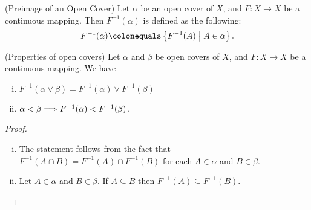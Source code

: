 \documentclass[10pt,twoside,draft]{book}
\begin{document}
\begin{definition}
  (Preimage of an Open Cover)
  Let $\alpha$ be an open cover of $X$, and $F: X \to X$ be a continuous mapping.
  Then $F^{-1}(\alpha)$ is defined as the following:
  \begin{equation*}
    F^{-1}(\alpha) \ceq \setst{F^{-1}(A)}{A \in \alpha}.
  \end{equation*}
\end{definition}
\begin{proposition}
  (Properties of open covers)
  Let $\alpha$ and $\beta$ be open covers of $X$, and $F: X \to X$ be a continuous mapping.
  We have
  \begin{enumerate}[(i)]
    \item $F^{-1}(\alpha \vee  \beta) = F^{-1}(\alpha) \vee F^{-1}(\beta)$
    \item $\alpha < \beta \Longrightarrow F^{-1}(\alpha) < F^{-1}(\beta)$.
  \end{enumerate}
  \begin{proof}
  \begin{enumerate}[(i)]
    \item 
      The statement follows from the fact that $F^{-1}(A \cap B) = F^{-1}(A) \cap F^{-1}(B)$ for each $A \in \alpha$ and $B \in \beta$.
    \item Let $A \in \alpha$ and $B \in \beta$. 
      If $A \subseteq B$ then $F^{-1}(A) \subseteq F^{-1}(B)$.
  \end{enumerate}
  \end{proof}
\end{proposition}
\end{document}
